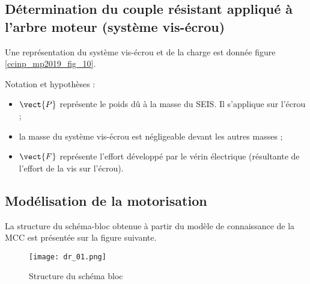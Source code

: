 \subsection{Détermination du couple résistant appliqué à l’arbre moteur (système vis-écrou)}

 Une représentation du système vis-écrou et de la charge est donnée figure \ref{ccinp_mp2019_fig_10}.


\begin{minipage}[c]{.47\linewidth}
\begin{center}
\end{center}
\end{minipage} \hfill
\begin{minipage}[c]{.47\linewidth}
 Notation et hypothèses :
 \begin{itemize}
 \item $\vect{P}$ représente le poids dû à la masse du SEIS. Il s’applique sur l’écrou ;
\item la masse du système vis-écrou est négligeable devant les autres masses ;
\item $\vect{F}$ représente l’effort développé par le vérin électrique (résultante de l’effort de 
la vis sur l’écrou).
\end{itemize}
\end{minipage}




\subsection*{Modélisation de la motorisation}

La structure du schéma-bloc obtenue à partir du modèle de connaissance de la MCC est présentée sur la figure suivante.

\begin{figure}[!h]
\centering
\texttt{[image: dr\_01.png]}
\caption{Structure du schéma bloc \label{dr_01}}
\end{figure}

